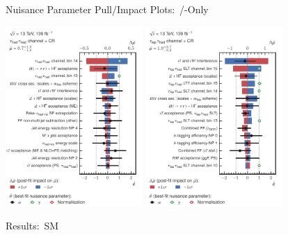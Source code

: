 \documentclass[11pt, xcolor={dvipsnames}, aspectratio=169, notes]{beamer}
\begin{document}

\begin{frame}{Nuisance Parameter Pull/Impact Plots:\ \allbold{\hadhad}/\allbold{\lephad}-Only}
  \centering

  \includegraphics[width=0.39\textwidth]{results_nonres/rankings/ranking_nonres_hadhad}\hspace*{3em}
  \includegraphics[width=0.39\textwidth]{results_nonres/rankings/ranking_nonres_lephad}
\end{frame}


\begin{frame}{Results:\ SM~\allbold{\HH}}
  \centering\footnotesize

  
\end{frame}

\end{document}
